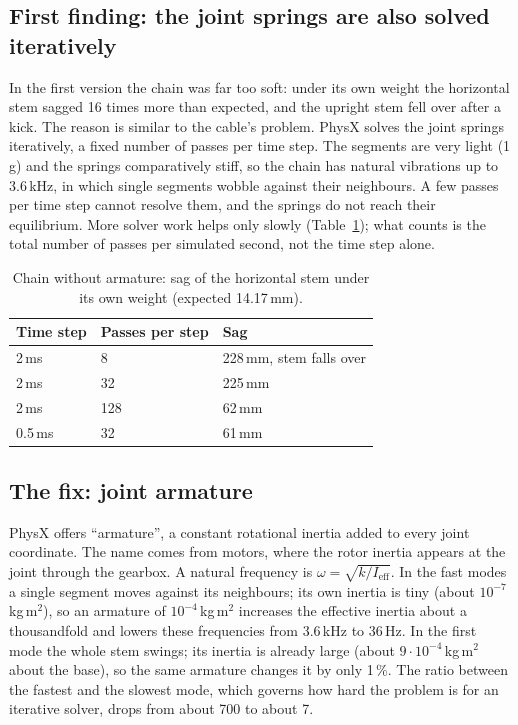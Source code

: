 \documentclass[11pt,a4paper]{article}
\begin{document}
\subsection{First finding: the joint springs are also solved iteratively}

In the first version the chain was far too soft: under its own weight the horizontal stem sagged 16 times more
than expected, and the upright stem fell over after a kick. The reason is similar to the cable's problem. PhysX
solves the joint springs iteratively, a fixed number of passes per time step. The segments are very light
(1\,g) and the springs comparatively stiff, so the chain has natural vibrations up to 3.6\,kHz, in which single
segments wobble against their neighbours. A few passes per time step cannot resolve them, and the springs do
not reach their equilibrium. More solver work helps only slowly (Table~\ref{tab:chain-iterations}); what counts
is the total number of passes per simulated second, not the time step alone.

\begin{table}[h]
  \centering
  \caption{Chain without armature: sag of the horizontal stem under its own weight (expected 14.17\,mm).}
  \label{tab:chain-iterations}
  \begin{tabular}{lll}
    \toprule
    Time step & Passes per step & Sag \\
    \midrule
    2\,ms   & 8   & 228\,mm, stem falls over \\
    2\,ms   & 32  & 225\,mm \\
    2\,ms   & 128 & 62\,mm \\
    0.5\,ms & 32  & 61\,mm \\
    \bottomrule
  \end{tabular}
\end{table}

\subsection{The fix: joint armature}

PhysX offers ``armature'', a constant rotational inertia added to every joint coordinate. The name comes from
motors, where the rotor inertia appears at the joint through the gearbox. A natural frequency is
$\omega = \sqrt{k / I_\text{eff}}$. In the fast modes a single segment moves against its neighbours; its own
inertia is tiny (about $10^{-7}$\,kg\,m$^2$), so an armature of $10^{-4}$\,kg\,m$^2$ increases the effective
inertia about a thousandfold and lowers these frequencies from 3.6\,kHz to 36\,Hz. In the first mode the whole
stem swings; its inertia is already large (about $9\cdot10^{-4}$\,kg\,m$^2$ about the base), so the same
armature changes it by only 1\,\%. The ratio between the fastest and the slowest mode, which governs how hard the
problem is for an iterative solver, drops from about 700 to about 7.
\end{document}
